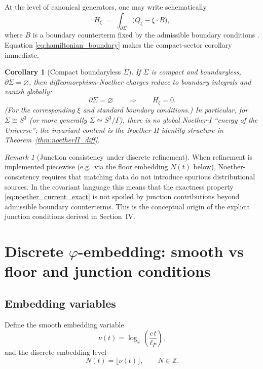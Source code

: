 \documentclass[
  reprint,
  amsmath,amssymb,
  aps,
  prd,
  superscriptaddress,
  nofootinbib,
  longbibliography
]{revtex4-2}
\newcommand{\phig}{\varphi}
\newcommand{\Sthree}{S^{3}}
\newcommand{\Sig}{\Sigma}
\newcommand{\ZZ}{\mathbb Z}
\newtheorem{corollary}{Corollary}
\theoremstyle{definition}
\theoremstyle{remark}
\newtheorem{remark}{Remark}
\begin{document}
At the level of canonical generators, one may write schematically
\begin{equation}
H_{\xi} \;=\; \int_{\partial\Sig} \bigl(Q_{\xi} - \xi\cdot B\bigr),
\label{eq:hamiltonian_boundary}
\end{equation}
where $B$ is a boundary counterterm fixed by the admissible boundary conditions \cite{IyerWald1994,WaldBook}.
Equation \eqref{eq:hamiltonian_boundary} makes the compact-sector corollary immediate.

\begin{corollary}[Compact boundaryless $\Sig$]
\label{cor:S3_charge_zero}
If $\Sig$ is compact and boundaryless, $\partial\Sig=\varnothing$, then diffeomorphism-Noether charges reduce to
boundary integrals and vanish globally:
\begin{equation}
\partial\Sig=\varnothing \qquad\Longrightarrow\qquad H_{\xi}=0.
\end{equation}
\noindent(For the corresponding $\xi$ and standard boundary conditions.)
In particular, for $\Sig\cong\Sthree$ (or more generally $\Sig\simeq\Sthree/\Gamma$), there is no global Noether-I
``energy of the Universe''; the invariant content is the Noether-II identity structure in
Theorem~\ref{thm:noetherII_diff}.
\end{corollary}

\begin{remark}[Junction consistency under discrete refinement]
When refinement is implemented piecewise (e.g.\ via the floor embedding $N(t)$ below), Noether-consistency requires
that matching data do not introduce spurious distributional sources. In the covariant language this means that the
exactness property \eqref{eq:noether_current_exact} is not spoiled by junction contributions beyond admissible
boundary counterterms. This is the conceptual origin of the explicit junction conditions derived in
Section~IV.
\end{remark}

\section{\texorpdfstring{Discrete $\phig$-embedding: smooth vs floor and junction conditions}{Discrete phi-embedding: smooth vs floor and junction conditions}}
\subsection{Embedding variables}
Define the smooth embedding variable
\begin{equation}
\nu(t)=\log_{\phig}\!\left(\frac{c\,t}{\ell_P}\right),
\label{eq:nu_def}
\end{equation}
and the discrete embedding level
\begin{equation}
N(t)=\lfloor \nu(t)\rfloor,\qquad N\in\ZZ.
\label{eq:N_floor}
\end{equation}
\end{document}
